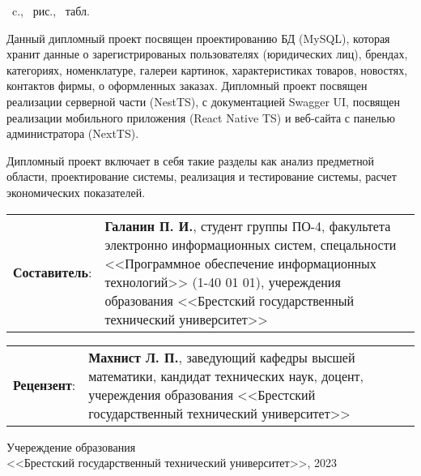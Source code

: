 
\pageref{LastPage}~c., \totalfigures~рис., \totaltables~табл.

\hspace{0pt}

Данный дипломный проект посвящен проектированию БД (MySQL),
которая хранит данные
о зарегистрированых пользователях (юридических лиц),
брендах, категориях, номенклатуре, галереи картинок, характеристиках товаров,
новостях, контактов фирмы, о оформленных заказах.
Дипломный проект посвящен реализации серверной части (NestTS), с документацией Swagger UI,
посвящен реализации мобильного приложения (React Native TS)
и веб-сайта с панелью администратора (NextTS).

Дипломный проект включает в себя такие разделы как
анализ предметной области,
проектирование системы,
реализация и тестирование системы,
расчет экономических показателей.

\vfill

\begin{tabular}{p{3cm}p{12cm}}
    \textbf{Составитель}: & \textbf{Галанин П. И.},
    студент группы ПО-4,
    факультета электронно информационных систем,
    спецальности <<Программное обеспечение информационных технологий>> (1-40 01 01),
    учереждения образования <<Брестский государственный технический университет>>
\end{tabular}

\vfill

\begin{tabular}{p{3cm}p{12cm}}
    \textbf{Рецензент}: & \textbf{Махнист Л. П.},
    заведующий кафедры высшей математики,
    кандидат технических наук,
    доцент,
    учереждения образования <<Брестский государственный технический университет>>
\end{tabular}

\vfill

\begin{flushright}
    \begin{minipage}[t]{.85\textwidth}
        Учереждение образования\\
        <<Брестский государственный технический университет>>, 2023
    \end{minipage}
\end{flushright}
